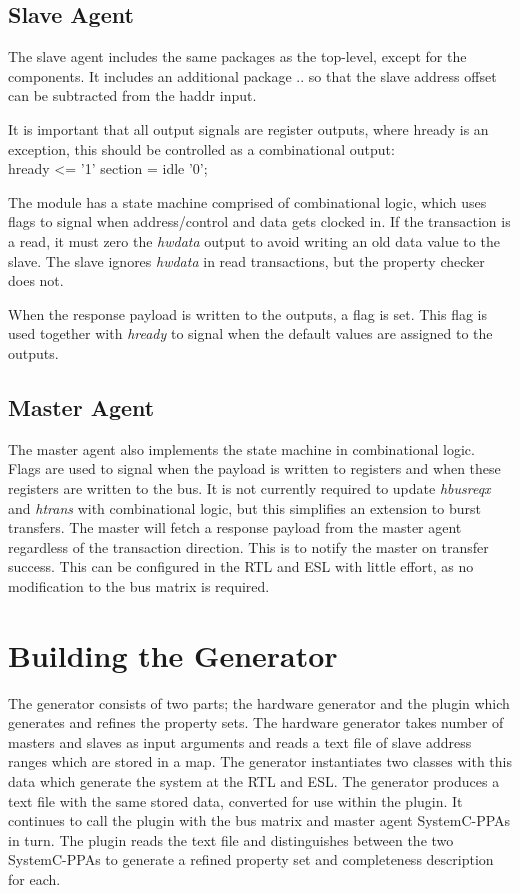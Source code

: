 \subsection{Slave Agent}
The slave agent includes the same packages as the top-level, except for the components. It includes an additional package .. so that the slave address offset can be subtracted from the haddr input. \par
It is important that all output signals are register outputs, where hready is an exception, this should be controlled as a combinational output: \\
hready <= '1'  section = idle  '0'; \par
The module has a state machine comprised of combinational logic, which uses flags to signal when address/control and data gets clocked in. If the transaction is a read, it must zero the \textit{hwdata} output to avoid writing an old data value to the slave. The slave ignores \textit{hwdata} in read transactions, but the property checker does not. \par 
When the response payload is written to the outputs, a flag is set. This flag is used together with \textit{hready} to signal when the default values are assigned to the outputs.

\subsection{Master Agent}
The master agent also implements the state machine in combinational logic. Flags are used to signal when the payload is written to registers and when these registers are written to the bus. It is not currently required to update \textit{hbusreqx} and \textit{htrans} with combinational logic, but this simplifies an extension to burst transfers. The master will fetch a response payload from the master agent regardless of the transaction direction. This is to notify the master on transfer success. This can be configured in the RTL and ESL with little effort, as no modification to the bus matrix is required.  
 

\section{Building the Generator}
The generator consists of two parts; the hardware generator and the plugin which generates and refines the property sets. The hardware generator takes number of masters and slaves as input arguments and reads a text file of slave address ranges which are stored in a map. The generator instantiates two classes with this data which generate the system at the RTL and ESL. The generator produces a text file with the same stored data, converted for use within the plugin. It continues to call the plugin with the bus matrix and master agent SystemC-PPAs in turn. The plugin reads the text file and distinguishes between the two SystemC-PPAs to generate a refined property set and completeness description for each. 

